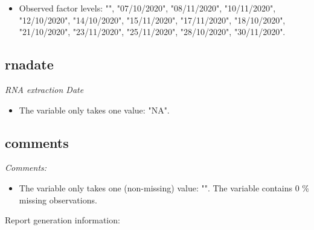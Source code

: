 \documentclass[]{article}
\providecommand{\tightlist}{%
  \setlength{\itemsep}{0pt}\setlength{\parskip}{0pt}}
\begin{document}
\begin{itemize}
\tightlist
\item
  Observed factor levels: "", "07/10/2020", "08/11/2020", "10/11/2020",
  "12/10/2020", "14/10/2020", "15/11/2020", "17/11/2020", "18/10/2020",
  "21/10/2020", "23/11/2020", "25/11/2020", "28/10/2020", "30/11/2020".
\end{itemize}

\noindent\makebox[\linewidth]{\rule{\textwidth}{0.4pt}}

\hypertarget{rnadate}{%
\subsection{rnadate}\label{rnadate}}

\emph{RNA extraction Date}

\begin{itemize}
\tightlist
\item
  The variable only takes one value: "NA".
\end{itemize}

\noindent\makebox[\linewidth]{\rule{\textwidth}{0.4pt}}

\hypertarget{comments}{%
\subsection{comments}\label{comments}}

\emph{Comments:}

\begin{itemize}
\tightlist
\item
  The variable only takes one (non-missing) value: "". The variable
  contains 0 \% missing observations.
\end{itemize}

\noindent\makebox[\linewidth]{\rule{\textwidth}{0.4pt}}

Report generation information:
\end{document}
